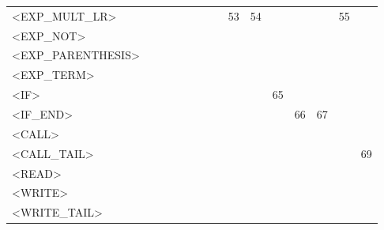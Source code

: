 \documentclass[a4paper,11pt]{article}
\begin{document}
\begin{longtable}{l||cccccccccccccc}
	<EXP\_MULT\_LR> & & & & & & & & 53 & 54 & & & & 55 & \\
	<EXP\_NOT>  & & & & & & & & & & & & & & \\
	<EXP\_PARENTHESIS>  & & & & & & & & & & & & & & \\
	<EXP\_TERM>  & & & & & & & & & & & & & & \\
	<IF>  & & & & & & & & & & 65 & & & & \\
	<IF\_END>  & & & & & & & & & & & 66 & 67 & & \\
	<CALL>  & & & & & & & & & & & & & & \\
	<CALL\_TAIL> & & & & & & & & & & & & & & 69 \\
	<READ>  & & & & & & & & & & & & & & \\
	<WRITE> & & & & & & & & & & & & & & \\
	<WRITE\_TAIL>  & & & & & & & & & & & & & & \\
\end{longtable}
\end{document}
